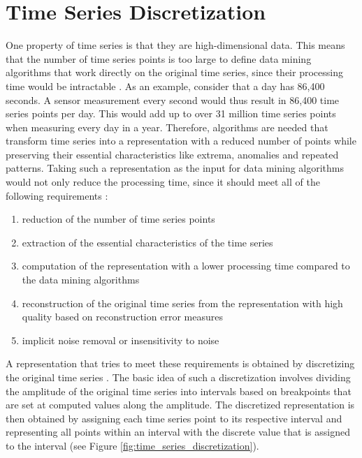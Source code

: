 \chapter{Time Series Discretization} \label{chap:ts_discretization}
One property of time series is that they are high-dimensional data. This means that the number of time series points is too large to define data mining algorithms that work directly on the original time series, since their processing time would be intractable \cite{Survey_Esling}. As an example, consider that a day has 86,400 seconds. A sensor measurement every second would thus result in 86,400 time series points per day. This would add up to over 31 million time series points when measuring every day in a year. \newline
Therefore, algorithms are needed that transform time series into a representation with a reduced number of points while preserving their essential characteristics like extrema, anomalies and repeated patterns. Taking such a representation as the input for data mining algorithms would not only reduce the processing time, since it should meet all of the following requirements \cite{Survey_Esling}:
\vspace{-3pt}
\begin{enumerate}[itemsep=-10pt]
\item reduction of the number of time series points
\item extraction of the essential characteristics of the time series
\item computation of the representation with a lower processing time compared to the data mining algorithms
\item reconstruction of the original time series from the representation with high quality based on reconstruction error measures
\item implicit noise removal or insensitivity to noise
\end{enumerate}
\vspace{-3pt}
A representation that tries to meet these requirements is obtained by discretizing the original time series \cite{Survey_Temporal_Discretization}. The basic idea of such a discretization involves dividing the amplitude of the original time series into intervals based on breakpoints that are set at computed values along the amplitude. The discretized representation is then obtained by assigning each time series point to its respective interval and representing all points within an interval with the discrete value that is assigned to the interval (see Figure \ref{fig:time_series_discretization}).
